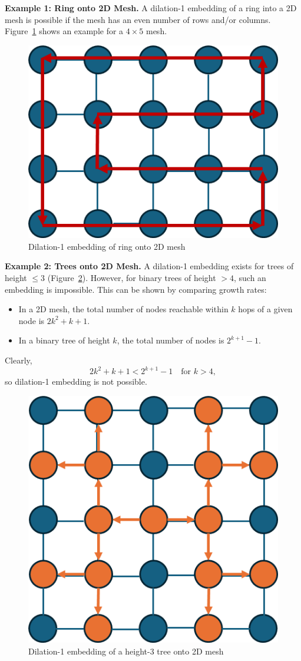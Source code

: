 \documentclass[12pt]{book}
\begin{document}
\medskip
\textbf{Example 1: Ring onto 2D Mesh.}  
A dilation-1 embedding of a ring into a 2D mesh is possible if the mesh has an even number of rows and/or columns. Figure~\ref{fig:2dmeshring} shows an example for a $4 \times 5$ mesh.

\begin{figure}[ht]
    \centering
    \includegraphics[width=0.5\linewidth]{images/2dmeshproj.png}
    \caption{Dilation-1 embedding of ring onto 2D mesh}
    \label{fig:2dmeshring}
\end{figure}

\medskip
\textbf{Example 2: Trees onto 2D Mesh.}  
A dilation-1 embedding exists for trees of height $\leq 3$ (Figure~\ref{fig:2dmeshtree}). However, for binary trees of height $>4$, such an embedding is impossible. This can be shown by comparing growth rates:  
\begin{itemize}
    \item In a 2D mesh, the total number of nodes reachable within $k$ hops of a given node is $2k^2 + k + 1$.
    \item In a binary tree of height $k$, the total number of nodes is $2^{k+1}-1$.
\end{itemize}
Clearly,
\[
2k^2 + k + 1 < 2^{k+1} - 1 \quad \text{for } k > 4,
\]
so dilation-1 embedding is not possible.

\begin{figure}[ht]
    \centering
    \includegraphics[width=0.5\linewidth]{images/2dmeshtree.png}
    \caption{Dilation-1 embedding of a height-3 tree onto 2D mesh}
    \label{fig:2dmeshtree}
\end{figure}
\end{document}
